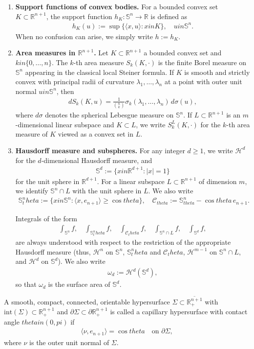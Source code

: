 \documentclass[12pt]{amsart}
\def\theta{theta}%
\def\pi{pi}%
\def\in{in }%
\numberwithin{equation}{section}
\newcommand{\bbR}{\mathbb{R}}
\newcommand{\bbS}{\mathbb{S}}
\newcommand{\Sn}{\mathbb{S}^n}
\newcommand{\8}{\infty}
\newcommand{\la}{\lambda}
\newcommand{\si}{\sigma}
\newcommand{\cC}{\mathcal{C}}
\newcommand{\eq}[1]{\begin{equation}\begin{alignedat}{2}#1\end{alignedat}\end{equation}}
\newcommand{\Cth}{\cC_\theta}
\newcommand{\Hd}{\mathcal{H}}
\newcommand{\R}{\mathbb{R}}
\begin{document}
\begin{enumerate}[(1)]
\item \textbf{Support functions of convex bodies.}
For a bounded convex set $K\subset\bbR^{n+1}$, the support function
$h_K:\Sn\to\bbR$ is defined as
\eq{
  h_K(u):=\sup\{\langle x,u\rangle:x\in K\},\quad u\in\Sn.
}
When no confusion can arise, we simply write $h:=h_K$.

\item \textbf{Area measures in $\bbR^{n+1}$.}
Let $K\subset\bbR^{n+1}$ a bounded convex set and $k\in\{0,\dots,n\}$. The $k$-th area measure $S_k(K,\cdot)$ is the finite Borel measure on $\Sn$ appearing in the classical local Steiner formula. If $K$ is smooth and strictly convex with principal radii of curvature $\la_1,\dots,\la_n$ at a point with outer unit normal $u\in\Sn$, then
\eq{
  dS_k(K,u)
  = \frac{1}{\binom{n}{k}}
    \sigma_k(\la_1,\dots,\la_n)\,d\si(u),
}
where $d\si$ denotes the spherical Lebesgue measure on $\Sn$.
If $L\subset\bbR^{n+1}$ is an $m$-dimensional linear subspace and
$K\subset L$, we write $S_k^L(K,\cdot)$ for the $k$-th area measure of
$K$ viewed as a convex set in $L$.

\item \textbf{Hausdorff measure and subspheres.}
For any integer $d\ge 1$, we write $\Hd^d$ for the $d$-dimensional Hausdorff measure, and
\eq{
  \bbS^d := \{x\in\R^{d+1} : |x|=1\}
}
for the unit sphere in $\R^{d+1}$. For a linear subspace
$L\subset\R^{n+1}$ of dimension $m$, we identify $\Sn\cap L$ with the unit sphere in $L$.
We also write
\eq{
  \mathbb{S}^n_\theta := \{x\in\Sn : \langle x,e_{n+1}\rangle \ge \cos\theta\}, \quad \cC_{\theta}:=\bbS^n_{\theta}-\cos\theta\, e_{n+1}.
}

Integrals of the form
\eq{
  \int_{\Sn} f,\quad
  \int_{\mathbb{S}^n_\theta} f,\quad
  \int_{\Cth} f,\quad
  \int_{\Sn\cap L} f,\quad
  \int_{\bbS^d} f,
}
are always understood with respect to the restriction of the appropriate Hausdorff measure
(thus, $\Hd^n$ on $\Sn$, $\mathbb{S}^n_\theta$ and $\Cth$, $\Hd^{m-1}$ on $\Sn\cap L$, and $\Hd^{d}$ on $\bbS^d$).
We also write
\eq{
  \omega_d := \Hd^{d}(\mathbb{S}^d),
}
so that $\omega_d$ is the surface area of $\mathbb{S}^d$.
\end{enumerate}


\begin{defn}
A smooth, compact, connected, orientable hypersurface $\Sigma \subset \overline{\mathbb{R}^{n+1}_+}$ with $\mathrm{int}(\Sigma) \subset \mathbb{R}^{n+1}_+$ and $\partial\Sigma \subset \partial\mathbb{R}^{n+1}_+$ is called a capillary hypersurface with contact angle $\theta \in (0,\pi)$ if
\eq{
\langle \nu, e_{n+1} \rangle = \cos\theta \quad \text{on } \partial\Sigma,
}
where $\nu$ is the outer unit normal of $\Sigma$.
\end{defn}
\end{document}

